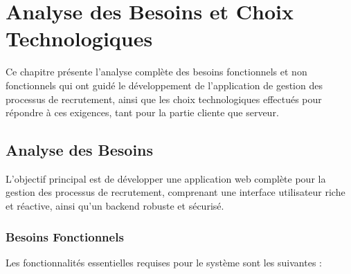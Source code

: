 \chapter{Analyse des Besoins et Choix Technologiques}

Ce chapitre présente l'analyse complète des besoins fonctionnels et non fonctionnels qui ont guidé le développement de l'application de gestion des processus de recrutement, ainsi que les choix technologiques effectués pour répondre à ces exigences, tant pour la partie cliente que serveur.

\section{Analyse des Besoins}

L'objectif principal est de développer une application web complète pour la gestion des processus de recrutement, comprenant une interface utilisateur riche et réactive, ainsi qu'un backend robuste et sécurisé.

\subsection{Besoins Fonctionnels}

Les fonctionnalités essentielles requises pour le système sont les suivantes :

